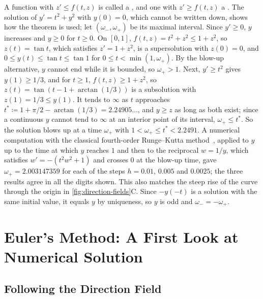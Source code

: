 A function with $z'\le f(t,z)$ is called a , and one with $z'\ge f(t,z)$ a . The solution of $y'=t^2+y^2$ with $y(0)=0$, which cannot be written down, shows how the theorem is used; let $(\omega_-,\omega_+)$ be its maximal interval. Since $y'\ge0$, $y$ increases and $y\ge0$ for $t\ge0$. On $[0,1]$, $f(t,z)=t^2+z^2\le1+z^2$, so $z(t)=\tan t$, which satisfies $z'=1+z^2$, is a supersolution with $z(0)=0$, and $0\le y(t)\le\tan t\le\tan1$ for $0\le t<\min(1,\omega_+)$. By the blow-up alternative, $y$ cannot end while it is bounded, so $\omega_+>1$. Next, $y'\ge t^2$ gives $y(1)\ge1/3$, and for $t\ge1$, $f(t,z)\ge1+z^2$, so $z(t)=\tan(t-1+\arctan(1/3))$ is a subsolution with $z(1)=1/3\le y(1)$. It tends to $\infty$ as $t$ approaches $t^*\coloneqq1+\pi/2-\arctan(1/3)=2.24905\ldots$, and $y\ge z$ as long as both exist; since a continuous $y$ cannot tend to $\infty$ at an interior point of its interval, $\omega_+\le t^*$. So the solution blows up at a time $\omega_+$ with $1<\omega_+\le t^*<2.2491$. A numerical computation with the classical fourth-order Runge--Kutta method~\cite[Chap.~II]{hairer1993}, applied to $y$ up to the time at which $y$ reaches $1$ and then to the reciprocal $w=1/y$, which satisfies $w'=-(t^2w^2+1)$ and crosses $0$ at the blow-up time, gave $\omega_+=2.003147359$ for each of the steps $h=0.01$, $0.005$ and $0.0025$; the three results agree in all the digits shown. This also matches the steep rise of the curve through the origin in \cref{fig:direction-fields}C. Since $-y(-t)$ is a solution with the same initial value, it equals $y$ by uniqueness, so $y$ is odd and $\omega_-=-\omega_+$.

\section{Euler's Method: A First Look at Numerical Solution}
\label{sec:euler}

\subsection{Following the Direction Field}

